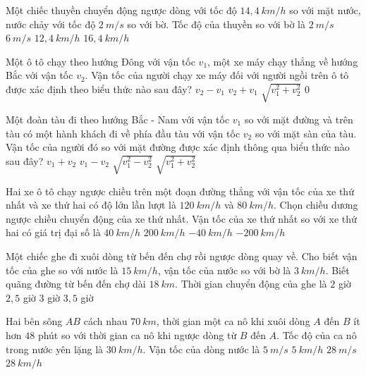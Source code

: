 \begin{ex}%
Một chiếc thuyền chuyển động ngược dòng với tốc độ $14,4 \ km/h$ so với mặt nước, nước chảy với tốc độ $2 \ m/s$ so với bờ. Tốc độ của thuyền so với bờ là
\choice
{\True $2 \ m/s$}
{$6 \ m/s$}
{$12,4 \ km/h$}
{$16,4 \ km/h$}
\loigiai{

}
\end{ex}
\begin{ex}%
Một ô tô chạy theo hướng Đông với vận tốc $v_1$, một xe máy chạy thẳng về hướng Bắc với vận tốc $v_2$. Vận tốc của người chạy xe máy đối với người ngồi trên ô tô được xác định theo biểu thức nào sau đây?
\choice
{$v_2-v_1$}
{$v_2+v_1$}
{\True $\sqrt{v_1^2+v_2^2}$}
{$0$}
\loigiai{

}
\end{ex}
\begin{ex}%
Một đoàn tàu đi theo hướng Bắc - Nam với vận tốc $v_1$ so với mặt đường và trên tàu có một hành khách đi về phía đầu tàu với vận tốc $v_2$ so với mặt sàn của tàu. Vận tốc của người đó so với mặt đường được xác định thông qua biểu thức nào sau đây?
\choice
{\True $v_1+v_2$}
{$v_1-v_2$}
{$\sqrt{v_1^2-v_2^2}$}
{$\sqrt{v_1^2+v_2^2}$}
\loigiai{

}
\end{ex}
\begin{ex}%
Hai xe ô tô chạy ngược chiều trên một đoạn đường thẳng với vận tốc của xe thứ nhất và xe thứ hai có độ lớn lần lượt là $120\ km/h$ và $80\ km/h$. Chọn chiều dương ngược chiều chuyển động của xe thứ nhất. Vận tốc của xe thứ nhất so với xe thứ hai có giá trị đại số là
\choice
{$40\ km/h$}
{$200\ km/h$}
{$-40\ km/h$}
{\True $-200\ km/h$}
\loigiai{

}
\end{ex}
\begin{ex}%
Một chiếc ghe đi xuôi dòng từ bến đến chợ rồi ngược dòng quay về. Cho biết vận tốc của ghe so với nước là $15 \ km/h$, vận tốc của nước so với bờ là $3 \ km/h$. Biết quãng đường từ bến đến chợ dài $18\ km$. Thời gian chuyển động của ghe là
\choice
{$2$ giờ}
{\True $2,5$ giờ}
{$3$ giờ}
{$3,5$ giờ}
\loigiai{

}
\end{ex}
\begin{ex}%
Hai bên sông $A B$ cách nhau $70\ km$, thời gian một ca nô khi xuôi dòng $A$ đến $B$ ít hơn $48$ phút so với thời gian ca nô khi ngược dòng từ $B$ đến $A$. Tốc độ của ca nô trong nước yên lặng là $30 \ km/h$. Vận tốc của dòng nước là
\choice
{$5 \ m/s$}
{\True $5 \ km/h$}
{$28 \ m/s$}
{$28 \ km/h$}
\loigiai{}
\end{ex}
